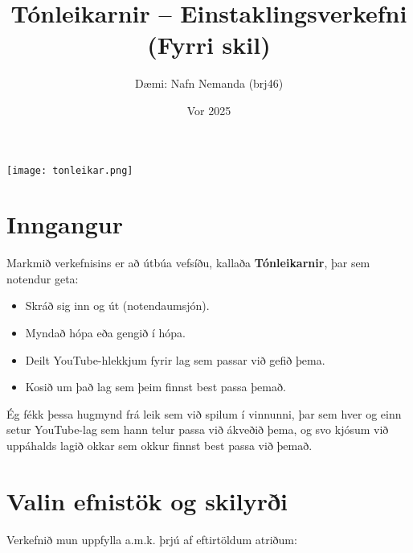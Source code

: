 \documentclass{article}
\title{Tónleikarnir – Einstaklingsverkefni (Fyrri skil)}
\author{Dæmi: Nafn Nemanda (brj46)}
\date{Vor 2025}
\begin{document}
\maketitle

\vspace{2em}

\begin{center}
    \texttt{[image: tonleikar.png]} %
\end{center}

\newpage

\section{Inngangur}
Markmið verkefnisins er að útbúa vefsíðu, kallaða \textbf{Tónleikarnir}, þar sem notendur geta:
\begin{itemize}
    \item Skráð sig inn og út (notendaumsjón).
    \item Myndað hópa eða gengið í hópa.
    \item Deilt YouTube-hlekkjum fyrir lag sem passar við gefið þema.
    \item Kosið um það lag sem þeim finnst best passa þemað. 
\end{itemize}

Ég fékk þessa hugmynd frá leik sem við spilum í vinnunni, þar sem hver og einn setur YouTube-lag sem hann telur passa við ákveðið þema, og svo kjósum við uppáhalds lagið okkar sem okkur finnst best passa við þemað.

\section{Valin efnistök og skilyrði}
Verkefnið mun uppfylla a.m.k. þrjú af eftirtöldum atriðum:
\end{document}
